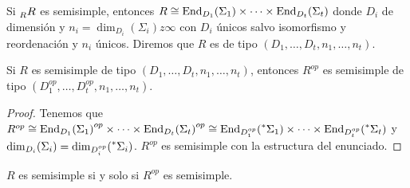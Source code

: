\begin{df}
  Si \(\prescript{}{R}{R}\) es semisimple, entonces
  \(R\cong\operatorname{End}_{D_1}(\Sigma_1)\times\cdots\times\operatorname{End}_{D_t}(\Sigma_t)\)
  donde \(D_i\) de dimensión y \(n_i=\dim_{D_i}(\Sigma_i)z\infty\) con
  \(D_i\) únicos salvo isomorfismo y reordenación y \(n_i\) únicos.
  Diremos que \(R\) es de tipo \((D_1,\ldots,D_t,n_1,\ldots,n_t)\).
\end{df}

\begin{teo}
  Si \({R}\) es semisimple de tipo
  \((D_1,\ldots,D_t,n_1,\ldots,n_t)\), entonces \(R^{op}\) es semisimple
  de tipo \((D_1^{op},\ldots,D_t^{op},n_1,\ldots,n_t)\).
\end{teo}
\begin{proof}
  Tenemos que \(R^{op}\cong{\operatorname{End}_{D_1}(\Sigma_1)}^{op}\times\cdots\times
{\operatorname{End}_{D_t}(\Sigma_t)}^{op}\cong
  {\operatorname{End}_{D_1^{op}}(\prescript{*}{}{\Sigma_1})}\times\cdots\times
  {\operatorname{End}_{D_t^{op}}(\prescript{*}{}{\Sigma_t})}\)
  y \(\dim_{D_i}(\Sigma_i)=\dim_{D_i^{op}}(\prescript{*}{}{\Sigma_i})\).
  \(R^{op}\) es semisimple con la estructura del enunciado.

\end{proof}


\begin{cor}
  \(R\) es semisimple si y solo si \(R^{op}\) es semisimple.
\end{cor}



